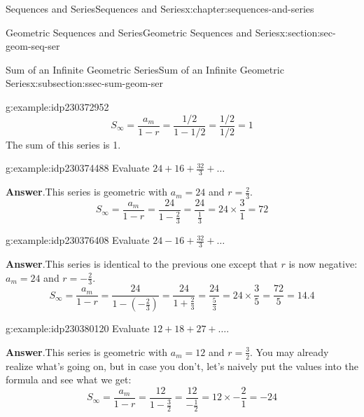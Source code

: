 \documentclass[twoside,10pt,]{book}
\newcommand{\blocktitlefont}{\relax}
\numberwithin{equation}{section}
\begin{document}
\begin{chapterptx}{Sequences and Series}{}{Sequences and Series}{}{}{x:chapter:sequences-and-series}
\begin{sectionptx}{Geometric Sequences and Series}{}{Geometric Sequences and Series}{}{}{x:section:sec-geom-seq-ser}
\begin{subsectionptx}{Sum of an Infinite Geometric Series}{}{Sum of an Infinite Geometric Series}{}{}{x:subsection:ssec-sum-geom-ser}
\begin{example}{}{g:example:idp230372952}
\begin{equation*}
{S_\infty } = \frac{{{a_m}}}{{1 - r}} = \frac{{1/2}}{{1 - 1/2}} = \frac{{1/2}}{{1/2}} = 1
\end{equation*}
The sum of this series is 1.\end{example}
 \begin{example}{}{g:example:idp230374488}%
Evaluate \(24 + 16 + \frac{32}{3}+ \ldots\)\par\smallskip%
\noindent\textbf{\blocktitlefont Answer}.\label{g:answer:idp230375256}{}\hypertarget{g:answer:idp230375256}{}\quad{}This series is geometric with \(a_m = 24\) and \(r = \frac{2}{3}\).%
\begin{equation*}
{S_\infty } = \frac{{{a_m}}}{{1 - r}} = \frac{{24}}{{1 - \frac{2}{3}}} = \frac{{24}}{{\frac{1}{3}}} = 24 \times \frac{3}{1} = 72
\end{equation*}
\end{example}
 \begin{example}{}{g:example:idp230376408}%
Evaluate \(24 - 16 + \frac{32}{3}+ \ldots\)\par\smallskip%
\noindent\textbf{\blocktitlefont Answer}.\label{g:answer:idp230379608}{}\hypertarget{g:answer:idp230379608}{}\quad{}This series is identical to the previous one except that \(r\) is now negative:  \(a_m = 24\) and \(r = -\frac{2}{3}\).%
\begin{equation*}
{S_\infty } = \frac{{{a_m}}}{{1 - r}} = \frac{{24}}{{1 - \left( { - \frac{2}{3}} \right)}} = \frac{{24}}{{1 + \frac{2}{3}}} = \frac{{24}}{{\frac{5}{3}}} = 24 \times \frac{3}{5} = \frac{{72}}{5} = 14.4
\end{equation*}
\end{example}
 \begin{example}{}{g:example:idp230380120}%
Evaluate \(12 + 18 + 27 + \ldots\).\par\smallskip%
\noindent\textbf{\blocktitlefont Answer}.\label{g:answer:idp230376920}{}\hypertarget{g:answer:idp230376920}{}\quad{}This series is geometric with \(a_m = 12\) and \(r = \frac{3}{2}\).  You may already realize what's going on, but in case you don't, let's naively put the values into the formula and see what we get:%
\begin{equation*}
{S_\infty } = \frac{{{a_m}}}{{1 - r}} = \frac{{12}}{{1 - \frac{3}{2}}} = \frac{{12}}{{ - \frac{1}{2}}} = 12 \times  - \frac{2}{1} =  - 24
\end{equation*}

\end{example}
\end{subsectionptx}
\end{sectionptx}
\end{chapterptx}
\end{document}

